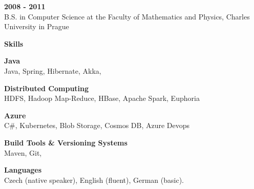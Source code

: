 \documentclass[a4paper,11pt,final]{memoir}
\newcommand{\Sep}{\vspace{1.4em}}
\newcommand{\SmallSep}{\vspace{0.7em}}
\newcommand{\CVSection}[1]
	{\Large\textbf{#1}\par
	\SmallSep\normalsize\normalfont}
\newcommand{\CVItem}[1]
	{\textbf{\color{RoyalBlue} #1}}
\begin{document}
\CVItem{2008 - 2011}\\
B.S. in Computer Science at the Faculty of Mathematics and Physics, Charles University in Prague
\Sep

\CVSection{Skills}

\CVItem{Java}\\
Java, Spring, Hibernate, Akka,
\SmallSep

\CVItem{Distributed Computing}\\
HDFS, Hadoop Map-Reduce, HBase, Apache Spark, Euphoria
\SmallSep

\CVItem{Azure}\\
C\#, Kubernetes, Blob Storage, Cosmos DB, Azure Devops
\SmallSep

\CVItem{Build Tools \& Versioning Systems}\\
Maven, Git,
\SmallSep 

\CVItem{Languages}\\
Czech (native speaker), English (fluent), German (basic).
\Sep 

\end{document}
